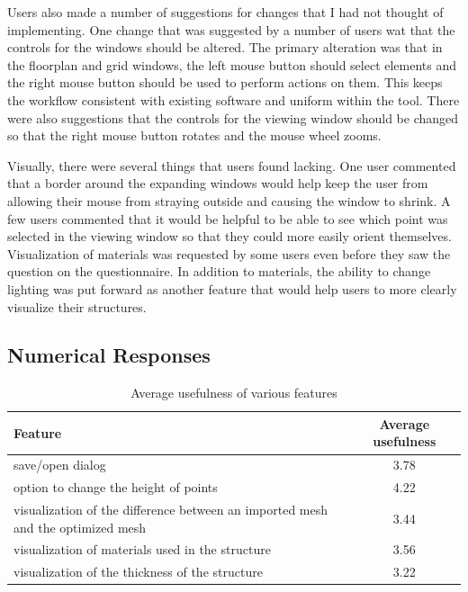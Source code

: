 \documentclass{thesis}
\begin{document}
Users also made a number of suggestions for changes that I had not thought of implementing.  One change that was suggested
by a number of users wat that the controls for the windows should be altered.  The primary alteration was that in the
floorplan and grid windows, the left mouse button should select elements and the right mouse button should be used to
perform actions on them.  This keeps the workflow consistent with existing software and uniform within the tool.  There
were also suggestions that the controls for the viewing window should be changed so that the right mouse button rotates
and the mouse wheel zooms.

Visually, there were several things that users found lacking.  One user commented that a border around the expanding windows
would help keep the user from allowing their mouse from straying outside and causing the window to shrink.  A few users
commented that it would be helpful to be able to see which point was selected in the viewing window so that they could more
easily orient themselves.  Visualization of materials was requested by some users even before they saw the question on the
questionnaire.  In addition to materials, the ability to change lighting was put forward as another feature that would help
users to more clearly visualize their structures.

\subsection{Numerical Responses}
\begin{table}
\begin{center}
  \begin{tabular}{ | p{3in} | c | }
    \hline
    Feature & Average usefulness \\ \hline
	save/open dialog & 3.78 \\ \hline
	option to change the height of points & 4.22 \\ \hline
	visualization of the difference between an imported mesh and the optimized mesh & 3.44 \\ \hline
	visualization of materials used in the structure & 3.56 \\ \hline
    visualization of the thickness of the structure & 3.22 \\ \hline
  \end{tabular}
  \caption{Average usefulness of various features}
  \label{tbl:features}
\end{center}
\end{table}
\end{document}
